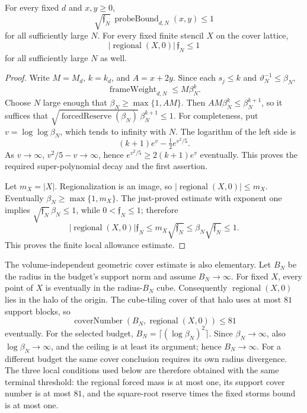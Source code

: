 \begin{lemma}
\label{lem:ex-marked-sanded}
For every fixed $d$ and $x,y\geq0$,
\[
 \sqrt{\mathfrak f_N}\,\operatorname{probeBound}_{d,N}(x,y)\leq1
\]
for all sufficiently large $N$.
For every fixed finite stencil $X$ on the cover lattice,
\[
 |\operatorname{regional}(X,0)|\,\mathfrak f_N\leq1
\]
for all sufficiently large $N$ as well.
\end{lemma}
\begin{proof}
Write $M=M_d$, $k=k_d$, and $A=x+2y$. Since each $s_j\leq k$ and
$\vartheta_N^{-1}\leq\beta_N$,
\[
 \operatorname{frameWeight}_{d,N}\leq M\beta_N^k.
\]
Choose $N$ large enough that $\beta_N\geq\max\{1,AM\}$. Then
$A M\beta_N^k\leq\beta_N^{k+1}$, so it suffices that
$\sqrt{\operatorname{forcedReserve}(\beta_N)}\,\beta_N^{k+1}\leq1$.
For completeness, put $v=\log\log\beta_N$, which tends to infinity
with $N$. The logarithm of the left side is
\[
 (k+1)e^v-\tfrac12e^{v^2/5}.
\]
As $v\to\infty$, $v^2/5-v\to\infty$, hence
$e^{v^2/5}\geq2(k+1)e^v$ eventually. This proves the required
super-polynomial decay and the first assertion.

Let $m_X=|X|$. Regionalization is an image, so
$|\operatorname{regional}(X,0)|\leq m_X$. Eventually
$\beta_N\geq\max\{1,m_X\}$. The just-proved estimate with exponent one
implies $\sqrt{\mathfrak f_N}\,\beta_N\leq1$, while
$0<\mathfrak f_N\leq1$; therefore
\[
 |\operatorname{regional}(X,0)|\mathfrak f_N
 \leq m_X\sqrt{\mathfrak f_N}
 \leq \beta_N\sqrt{\mathfrak f_N}\leq1.
\]
This proves the finite local allowance estimate.
\end{proof}

The volume-independent geometric cover estimate is also elementary. Let
$B_N$ be the radius in the budget's support norm and assume $B_N\to\infty$.
For fixed $X$, every point of $X$ is eventually in the radius-$B_N$ cube.
Consequently $\operatorname{regional}(X,0)$ lies in the halo of the
origin. The cube-tiling cover of that halo uses at most $81$ support
blocks, so
\begin{equation}\label{eq:ex-marked-cover}
 \operatorname{coverNumber}(B_N,\operatorname{regional}(X,0))\leq81
\end{equation}
eventually. For the selected budget, $B_N=\lceil(\log\beta_N)^2\rceil$.
Since $\beta_N\to\infty$, also $\log\beta_N\to\infty$, and the
ceiling is at least its argument; hence $B_N\to\infty$. For a different
budget the same cover conclusion requires its own radius divergence. The three
local conditions used below are therefore obtained with the
same terminal threshold: the regional forced mass is at most one, its
support cover number is at most $81$, and the square-root reserve times
the fixed storms bound is at most one.

